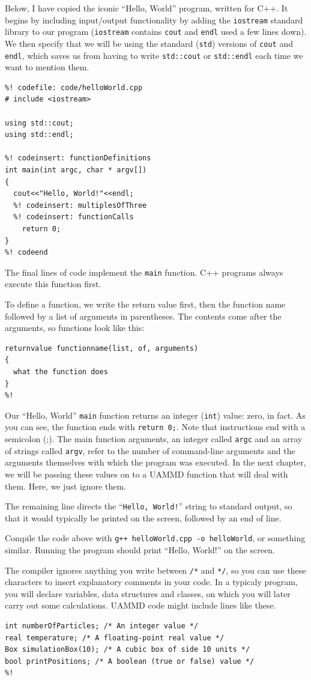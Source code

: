 Below, I have copied the iconic ``Hello, World'' program, written for C++. It
begins by including input/output functionality by adding the \texttt{iostream}
standard library to our program (\texttt{iostream} contains \texttt{cout} and
\texttt{endl} used a few lines down). We then specify that we will be using
the standard (\texttt{std}) versions of \texttt{cout} and \texttt{endl}, which
saves us from having to write \texttt{std::cout} or \texttt{std::endl} each
time we want to mention them.
\begin{lstlisting}
%! codefile: code/helloWorld.cpp
# include <iostream>

using std::cout;
using std::endl;

%! codeinsert: functionDefinitions
int main(int argc, char * argv[])
{
  cout<<"Hello, World!"<<endl;
  %! codeinsert: multiplesOfThree
  %! codeinsert: functionCalls
	return 0;
}
%! codeend
\end{lstlisting}

The final lines of code implement the \texttt{main} function. C++ programs
always execute this function first.

To define a function, we write the return value first, then the function name
followed by a list of arguments in parentheses. The contents come after the
arguments, so functions look like this:
\begin{lstlisting}
returnvalue functionname(list, of, arguments)
{
  what the function does
}
%!
\end{lstlisting}

Our ``Hello, World'' \texttt{main} function returns an integer (\texttt{int})
value: zero, in fact. As you can see, the function ends with \texttt{return 0;}.
Note that instructions end with a semicolon (;). The main function arguments, an
integer called \texttt{argc} and an array of strings called \texttt{argv}, refer
to the number of command-line arguments and the arguments themselves with which
the program was executed. In the next chapter, we will be passing these values
on to a UAMMD function that will deal with them. Here, we just ignore them.

The remaining line directs the ``\texttt{Hello, World!}'' string to standard
output, so that it would typically be printed on the screen, followed by an
end of line.

Compile the code above with \texttt{g++ helloWorld.cpp -o helloWorld}, or
something similar. Running the program should print ``Hello, World!'' on the
screen.

The compiler ignores anything you write between \texttt{/*} and \texttt{*/}, so
you can use these characters to insert explanatory comments in your code. In a
typicaly program, you will declare variables, data structures and classes, on
which you will later carry out some calculations. UAMMD code might include lines
like these.
\begin{lstlisting}
int numberOfParticles; /* An integer value */
real temperature; /* A floating-point real value */
Box simulationBox(10); /* A cubic box of side 10 units */
bool printPositions; /* A boolean (true or false) value */
%!
\end{lstlisting}

